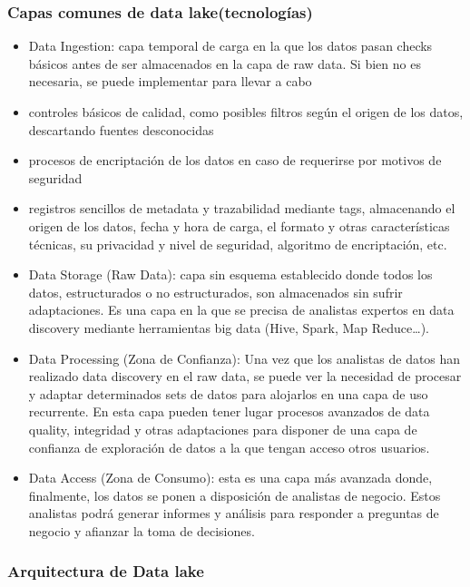\documentclass[twoside,twocolumn]{article}
\begin{document}
\subsubsection{Capas comunes de data lake(tecnologías)}
\begin{itemize}
    \item  Data Ingestion: capa temporal de carga en la que los datos pasan checks básicos antes de ser almacenados en la capa de raw data. Si bien no es necesaria, se puede implementar para llevar a cabo
    \item  controles básicos de calidad, como posibles filtros según el origen de los datos, descartando fuentes desconocidas
    \item  procesos de encriptación de los datos en caso de requerirse por motivos de seguridad
    \item  registros sencillos de metadata y trazabilidad mediante tags, almacenando el origen de los datos, fecha y hora de carga, el formato y otras características técnicas, su privacidad y nivel de seguridad, algoritmo de encriptación, etc.
    \item Data Storage (Raw Data): capa sin esquema establecido donde todos los datos, estructurados o no estructurados, son almacenados sin sufrir adaptaciones. Es una capa en la que se precisa de analistas expertos en data discovery mediante herramientas big data (Hive, Spark, Map Reduce…).
    \item  Data Processing (Zona de Confianza): Una vez que los analistas de datos han realizado data discovery en el raw data, se puede ver la necesidad de procesar y adaptar determinados sets de datos para alojarlos en una capa de uso recurrente. En esta capa pueden tener lugar procesos avanzados de data quality, integridad y otras adaptaciones para disponer de una capa de confianza de exploración de datos a la que tengan acceso otros usuarios.
    \item   Data Access (Zona de Consumo): esta es una capa más avanzada donde, finalmente, los datos se ponen a disposición de analistas de negocio. Estos analistas podrá generar informes y análisis para responder a preguntas de negocio y afianzar la toma de decisiones. 
\end{itemize}
\subsubsection{Arquitectura de Data lake}
\end{document}
